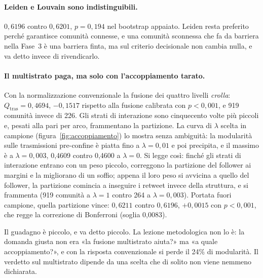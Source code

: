 \documentclass[11pt,a4paper]{article}
\newcommand{\Qtras}{Q_{\mathrm{tras}}}
\begin{document}
\paragraph{Leiden e Louvain sono indistinguibili.} $0{,}6196$ contro $0{,}6201$, $p = 0{,}194$ nel bootstrap appaiato. Leiden resta preferito perché garantisce comunità connesse, e una comunità sconnessa che fa da barriera nella Fase~3 è una barriera finta, ma sul criterio decisionale non cambia nulla, e va detto invece di rivendicarlo.

\paragraph{Il multistrato paga, ma solo con l'accoppiamento tarato.} Con la normalizzazione convenzionale la fusione dei quattro livelli \emph{crolla}: $\Qtras = 0{,}4694$, $-0{,}1517$ rispetto alla fusione calibrata con $p < 0{,}001$, e 919 comunità invece di 226. Gli strati di interazione sono cinquecento volte più piccoli e, pesati alla pari per arco, frammentano la partizione. La curva di $\lambda$ scelta in campione (figura~\ref{fig:accoppiamento}) lo mostra senza ambiguità: la modularità sulle trasmissioni pre-confine è piatta fino a $\lambda = 0{,}01$ e poi precipita, e il massimo è a $\lambda = 0{,}003$, 0,4609 contro 0,4600 a $\lambda = 0$. Si legge così: finché gli strati di interazione entrano con un peso piccolo, correggono la partizione del follower ai margini e la migliorano di un soffio; appena il loro peso si avvicina a quello del follower, la partizione comincia a inseguire i retweet invece della struttura, e si frammenta (919 comunità a $\lambda = 1$ contro 264 a $\lambda = 0{,}003$). Portata fuori campione, quella partizione vince: $0{,}6211$ contro $0{,}6196$, $+0{,}0015$ con $p < 0{,}001$, che regge la correzione di Bonferroni (soglia 0,0083).

Il guadagno è piccolo, e va detto piccolo. La lezione metodologica non lo è: la domanda giusta non era «la fusione multistrato aiuta?» ma «a quale accoppiamento?», e con la risposta convenzionale si perde il 24\% di modularità. Il verdetto sul multistrato dipende da una scelta che di solito non viene nemmeno dichiarata.
\end{document}
